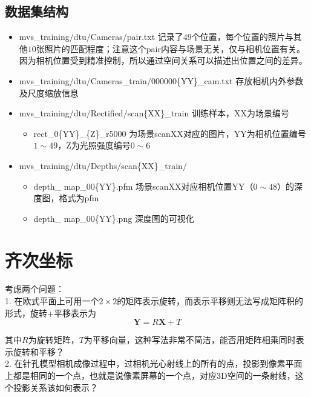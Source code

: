 \documentclass[hpyerref,UTF8,a4paper,titlepage,12pt,oneside]{ctexbook}
\theoremstyle{definition}
\begin{document}
	\subsection*{数据集结构}
		\begin{itemize}
			\item mvs{\_}training$\slash$dtu$\slash$Cameras$\slash$pair.txt 记录了$49$个位置，每个位置的照片与其他$10$张照片的匹配程度；注意这个pair内容与场景无关，仅与相机位置有关。因为相机位置受到精准控制，所以通过空间关系可以描述出位置之间的差异。

			\item mvs{\_}training$\slash$dtu$\slash$Cameras{\_}train$\slash$000000\{YY\}{\_}cam.txt 存放相机内外参数及尺度缩放信息

			\item mvs{\_}training$\slash$dtu$\slash$Rectified$\slash$scan\{XX\}{\_}train 训练样本，XX为场景编号
				\begin{itemize}
					\item rect{\_}0\{YY\}{\_}\{Z\}{\_}r5000 为场景scanXX对应的图片，YY为相机位置编号$ 1 \sim 49$，Z为光照强度编号$0 \sim 6$
				\end{itemize}

			\item mvs{\_}training$\slash$dtu$\slash$Depths$\slash$scan\{XX\}{\_}train$\slash$
				\begin{itemize}
					\item depth{\_} map{\_}00\{YY\}.pfm 场景scanXX对应相机位置YY（$0 \sim 48$）的深度图，格式为pfm
					\item depth{\_} map{\_}00\{YY\}.png 深度图的可视化
				\end{itemize}
			
		\end{itemize}

\section{齐次坐标}
		考虑两个问题：\\

		1. 在欧式平面上可用一个$2 \times 2$的矩阵表示旋转，而表示平移则无法写成矩阵积的形式，旋转+平移表示为
		$$
			\mathbf{Y} = R\mathbf{X} +T
		$$

		其中$R$为旋转矩阵，$T$为平移向量，这种写法非常不简洁，能否用矩阵相乘同时表示旋转和平移？\\

		2. 在针孔模型相机成像过程中，过相机光心射线上的所有的点，投影到像素平面上都是相同的一个点，也就是说像素屏幕的一个点，对应3D空间的一条射线，这个投影关系该如何表示？\\
\end{document}
